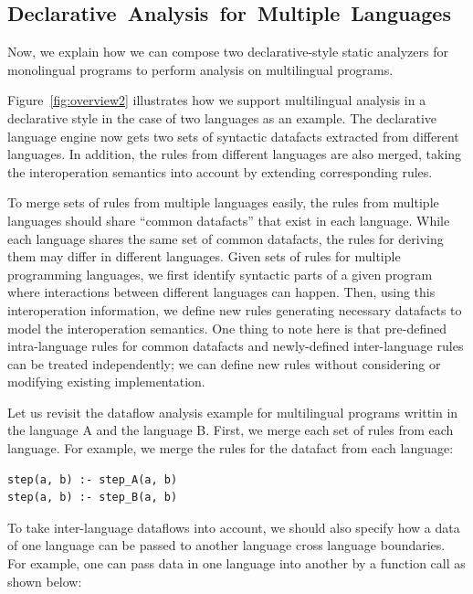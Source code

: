 \subsection{\mbox{Declarative Analysis for Multiple Languages}}
Now, we explain how we can compose two declarative-style static analyzers
for monolingual programs to perform analysis on multilingual programs.

Figure~\ref{fig:overview2} illustrates how we support multilingual
analysis in a declarative style in the case of two languages as an
example. The declarative language engine now gets two sets of
syntactic datafacts extracted from different languages. In addition,
the rules from different languages are also merged, taking the
interoperation semantics into account by extending corresponding
rules.

To merge sets of rules from multiple languages easily,
the rules from multiple languages should share ``common datafacts''
that exist in each language. While each language shares the same set of
common datafacts, the rules for deriving them may differ in different languages.
Given sets of rules for multiple programming languages,
we first identify syntactic parts of a given program where
interactions between different languages can happen.
Then, using this interoperation information,
we define new rules generating necessary datafacts to model
the interoperation semantics.
One thing to note here is that pre-defined intra-language rules for common
datafacts and newly-defined inter-language rules can be treated independently;
we can define new rules without considering or modifying existing
implementation.

Let us revisit the dataflow analysis example for multilingual programs
writtin in the language A and the language B.
First, we merge each set of rules from each language.
For example, we merge the rules for the datafact  from each language:
\begin{lstlisting}[style=myDatalog,xleftmargin=2.5em]
step(a, b) :- step_A(a, b)
step(a, b) :- step_B(a, b)
\end{lstlisting}
To take inter-language dataflows into account, we should also specify
how a data of one language can be passed to another language cross language
boundaries.  For example, one can pass data in one language into
another by a function call as shown below:

